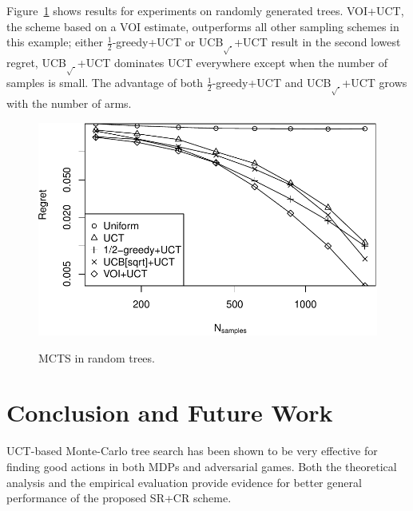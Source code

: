 \documentclass[letterpaper]{article}
\begin{document}
Figure~\ref{fig:mcts-regret} shows
results for experiments on randomly generated trees. VOI+UCT, the scheme based on a VOI estimate,
outperforms all other sampling schemes in this example; either $\frac 1
2$-greedy+UCT or UCB$_{\sqrt{\cdot}}$+UCT
result in the second lowest regret, UCB$_{\sqrt{\cdot}}$+UCT dominates UCT everywhere
except when the number of samples is small. The advantage of both $\frac 1
2$-greedy+UCT and UCB$_{\sqrt{\cdot}}$+UCT grows with the number of arms.
\begin{figure}[h!]
  \centering
  \includegraphics[scale=0.5]{tree-identity-k=32-uqb=8+voi.pdf}\\
  \caption{MCTS in random trees.}
  \label{fig:mcts-regret} 
\end{figure}

%


\section{Conclusion and Future Work}
\label{sec:summary}

UCT-based Monte-Carlo tree search has been shown to be very effective
for finding good actions in both MDPs and adversarial games.
Both the theoretical analysis and the empirical evaluation provide evidence for
better general performance of the proposed SR+CR scheme.
\end{document}
